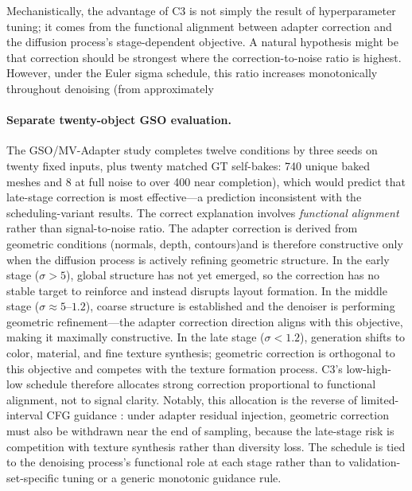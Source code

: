 \documentclass[times,twocolumn,final]{elsarticle}
\providecommand{\DIFadd}[1]{{\protect\color{blue} \sf #1}} %
\providecommand{\DIFdel}[1]{{\protect\color{red} \scriptsize #1}} %
\providecommand{\DIFaddbegin}{} %
\providecommand{\DIFaddend}{} %
\providecommand{\DIFdelbegin}{} %
\providecommand{\DIFdelend}{} %
\begin{document}
\DIFdelbegin \DIFdel{Mechanistically, the advantage of C3 is not simply the result of hyperparameter tuning; it comes from the functional alignment between adapter correction and the diffusion process's stage-dependent objective. A natural hypothesis might be that correction should be strongest where the correction-to-noise ratio is highest.
However, under the Euler sigma schedule, this ratio increases monotonically throughout denoising (from approximately }\DIFdelend \DIFaddbegin \paragraph{Separate twenty-object GSO evaluation.}
\DIFadd{The GSO/MV-Adapter study completes twelve conditions by three seeds on twenty fixed inputs, plus twenty matched GT self-bakes: 740 unique baked meshes and }\DIFaddend 8\DIFdelbegin \DIFdel{at full noise to over 400 near completion), which would predict that late-stage correction is most effective---a prediction inconsistent with the scheduling-variant results. The correct explanation involves \emph{functional alignment} rather than signal-to-noise ratio. The adapter correction is derived from geometric conditions (normals, depth, contours)and is therefore constructive only when the diffusion process is actively refining geometric structure. In the early stage ($\sigma > 5$), global structure has not yet emerged, so the correction has no stable target to reinforce and instead disrupts layout formation.
In the middle stage ($\sigma \approx 5$--$1.2$), coarse structure is established and the denoiser is performing geometric refinement---the adapter correction direction aligns with this objective, making it maximally constructive. In the late stage ($\sigma < 1.2$), generation shifts to color, material, and fine texture synthesis; geometric correction is orthogonal to this objective and competes with the texture formation process. C3's low-high-low schedule therefore allocates strong correction proportional to functional alignment, not to signal clarity. Notably, this allocation is the reverse of limited-interval CFG guidance \cite{kynkanniemi2024limited}: under adapter residual injection, geometric correction must also be withdrawn near the end of sampling, because the late-stage risk is competition with texture synthesis rather than diversity loss. The schedule is tied to the denoising process's functional role at each stage rather than to validation-set-specific tuning or a generic monotonic guidance rule. }%
\end{document}
